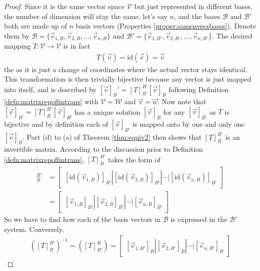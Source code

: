 \begin{proof}
Since it is the same vector space $\mathcal{V}$ but just represented in different bases, the number of dimension will stay the same, let's say $n$, and the bases $\mathcal{B}$ and $\mathcal{B}'$ both are made up of $n$ basis vectors (Properties \ref{proper:samenvecsbases}). Denote them by $\mathcal{B} = \{\vec{v}_{1,B}, \vec{v}_{2,B}, \ldots, \vec{v}_{n,B}\}$ and $\mathcal{B'} = \{\vec{v}_{1,B'}, \vec{v}_{2,B'}, \ldots, \vec{v}_{n,B'}\}$. The desired mapping $T: \mathcal{V} \to \mathcal{V}$ is in fact
\begin{align*}
T(\vec{v}) = \text{id}(\vec{v}) = \vec{v}
\end{align*}
the  as it is just a change of coordinates where the actual vector stays identical. This transformation is then trivially bijective because any vector is just mapped into itself, and is described by $[\vec{v}]_B' = [T]_B^{B'} [\vec{v}]_B$ following Definition \ref{defn:matrixrepoflintrans} with $\mathcal{V} = \mathcal{W}$ and $\vec{v} = \vec{w}$. Now note that $[\vec{v}]_{B'} = [T]_B^{B'} [\vec{v}]_{B'}$ has a unique solution $[\vec{v}]_B$ for any $[\vec{v}]_{B'}$ as $T$ is bijective and by definition each of $[\vec{v}]_{B'}$ is mapped onto by one and only one $[\vec{v}]_B$. Part (d) to (a) of Theorem \ref{thm:equiv2} then shows that $[T]_B^{B'}$ is an invertible matrix. According to the discussion prior to Definition \ref{defn:matrixrepoflintrans}, $[T]_B^{B'}$ takes the form of
\begin{align*}
[T]_B^{B'} &= \begin{bmatrix}
[\text{id}(\vec{v}_{1,B})]_{B'} | [\text{id}(\vec{v}_{2,B})]_{B'} | \cdots | [\text{id}(\vec{v}_{n,B})]_{B'}
\end{bmatrix} \\
&=
\begin{bmatrix}
[\vec{v}_{1,B}]_{B'} | [\vec{v}_{2,B}]_{B'} | \cdots | [\vec{v}_{n,B}]_{B'}
\end{bmatrix}
\end{align*}
So we have to find how each of the basis vectors in $\mathcal{B}$ is expressed in the $\mathcal{B}'$ system. Conversely,
\begin{align*}
([T]_B^{B'})^{-1} = ([T]_{B'}^B) =
\begin{bmatrix}
[\vec{v}_{1,B'}]_B | [\vec{v}_{2,B'}]_B | \cdots | [\vec{v}_{n,B'}]_B
\end{bmatrix}
\end{align*}

\end{proof}
